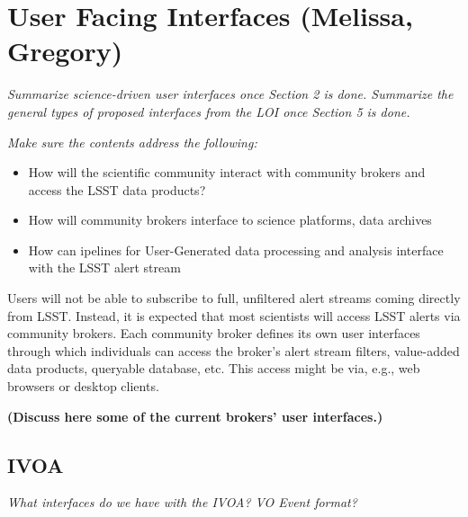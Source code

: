 \section{User Facing Interfaces (Melissa, Gregory)}  \label{sec:interfaces}


\smallskip
\noindent
{}

\smallskip
\noindent


\smallskip
\noindent
{\it Summarize science-driven user interfaces once Section 2 is done. Summarize the general types of proposed interfaces from the LOI once Section 5 is done.}

\smallskip
\noindent
{\it Make sure the contents address the following:
\begin{itemize}
    \item How will the scientific community interact with community brokers and access the LSST data products? 
    \item How will community brokers interface to science platforms, data archives 
    \item How can ipelines for User-Generated data processing and analysis interface with the LSST alert stream
\end{itemize}
}

\smallskip

Users will not be able to subscribe to full, unfiltered alert streams coming directly from LSST. Instead, it is expected that most scientists will access LSST alerts via community brokers. Each community broker defines its own user interfaces through which individuals can access the broker's alert stream filters, value-added data products, queryable database, etc. This access might be via, e.g., web browsers or desktop clients.

{\bf (Discuss here some of the current brokers' user interfaces.)}


\subsection{IVOA}\label{ssec:interfaces_ivoa}
{\it What interfaces do we have with the IVOA? VO Event format?}

